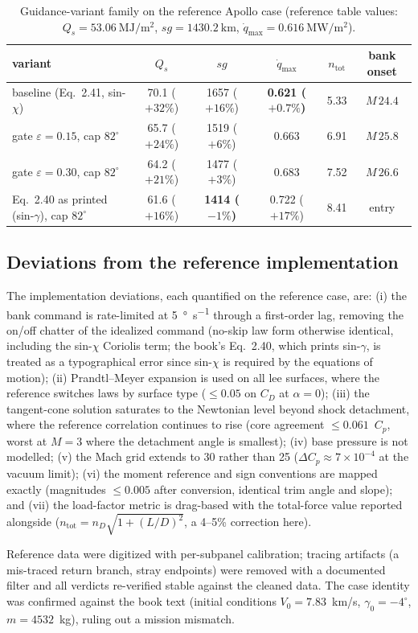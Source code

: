 \begin{table}[htbp]
\centering
\caption{Guidance-variant family on the reference Apollo case (reference
  table values: $Q_s=\SI{53.06}{\mega\joule\per\square\metre}$,
  $sg=\SI{1430.2}{\kilo\metre}$,
  $\dot{q}_{\max}=\SI{0.616}{\mega\watt\per\square\metre}$).}
\label{tab:variants}
\begin{tabular}{lccccc}
\toprule
variant & $Q_s$ & $sg$ & $\dot{q}_{\max}$ & $n_{\mathrm{tot}}$ &
bank onset \\
\midrule
baseline (Eq.~2.41, sin-$\chi$)      & 70.1 ($+32\%$) & 1657 ($+16\%$) &
  \textbf{0.621 ($+0.7\%$)} & 5.33 & $M\,24.4$ \\
gate $\varepsilon{=}0.15$, cap $82^\circ$ & 65.7 ($+24\%$) & 1519 ($+6\%$) &
  0.663 & 6.91 & $M\,25.8$ \\
gate $\varepsilon{=}0.30$, cap $82^\circ$ & 64.2 ($+21\%$) & 1477 ($+3\%$) &
  0.683 & 7.52 & $M\,26.6$ \\
Eq.~2.40 as printed (sin-$\gamma$), cap $82^\circ$ & 61.6 ($+16\%$) &
  \textbf{1414 ($-1\%$)} & 0.722 ($+17\%$) & 8.41 & entry \\
\bottomrule
\end{tabular}
\end{table}

\subsection{Deviations from the reference implementation}
\label{app:deviations}

The implementation deviations, each quantified on the reference case, are:
(i) the bank command is rate-limited at \SI{5}{\degree\per\s} through a
first-order lag, removing the on/off chatter of the idealized command
(no-skip law form otherwise identical, including the sin-$\chi$ Coriolis
term; the book's Eq.~2.40, which prints sin-$\gamma$, is treated as a
typographical error since sin-$\chi$ is required by the equations of
motion); (ii) Prandtl--Meyer expansion is used on all lee surfaces, where
the reference switches laws by surface type ($\le0.05$ on $C_D$ at
$\alpha=0$); (iii) the tangent-cone solution saturates to the Newtonian
level beyond shock detachment, where the reference correlation continues
to rise (core agreement $\le0.061$~$C_p$, worst at $M=3$ where the
detachment angle is smallest); (iv) base pressure is not modelled; (v) the
Mach grid extends to 30 rather than 25 ($\Delta C_p\approx7\times10^{-4}$
at the vacuum limit); (vi) the moment reference and sign conventions are
mapped exactly (magnitudes $\le0.005$ after conversion, identical trim
angle and slope); and (vii) the load-factor metric is drag-based with the
total-force value reported alongside
($n_{\mathrm{tot}}=n_D\sqrt{1+(L/D)^2}$, a 4--5\% correction here).

Reference data were digitized with per-subpanel calibration; tracing
artifacts (a mis-traced return branch, stray endpoints) were removed with
a documented filter and all verdicts re-verified stable against the
cleaned data. The case identity was confirmed against the book text
(initial conditions $V_0=7.83$~km/s, $\gamma_0=-4^\circ$,
$m=4532$~kg), ruling out a mission mismatch.

